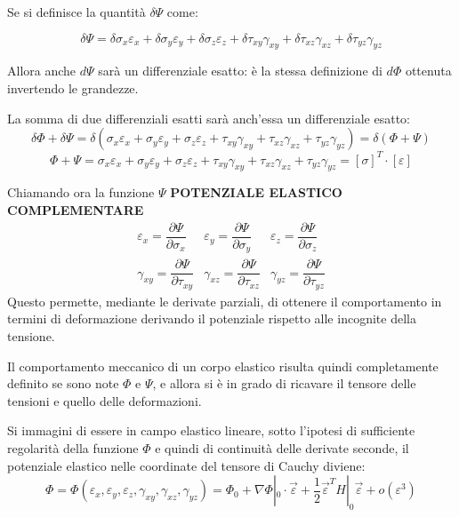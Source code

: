 \documentclass{article}
\begin{document}
\begin{adjustwidth}{2in}{}
	Se si definisce la quantità $\delta\Psi$ come: 
	
	\[
	\delta\Psi = \delta\sigma_x \varepsilon_x + \delta\sigma_y \varepsilon_y + \delta\sigma_z \varepsilon_z 
	+\delta\tau_{xy} \gamma_{xy} + \delta\tau_{xz} \gamma_{xz} + \delta\tau_{yz} \gamma_{yz}
	\]
	
	Allora anche  $d\Psi$ sarà un differenziale esatto: è la stessa definizione di $d\Phi$ ottenuta invertendo le grandezze. \newline
	
	La somma di due differenziali esatti sarà anch'essa un differenziale esatto: 
	\[
	\delta\Phi + \delta\Psi = \delta(\sigma_x \varepsilon_x + \sigma_y \varepsilon_y + \sigma_z \varepsilon_z 
	+\tau_{xy} \gamma_{xy} + \tau_{xz} \gamma_{xz} + \tau_{yz} \gamma_{yz}) = \delta(\Phi + \Psi)
	\]
	\[
	\Phi + \Psi = \sigma_x \varepsilon_x + \sigma_y \varepsilon_y + \sigma_z \varepsilon_z 
	+\tau_{xy} \gamma_{xy} + \tau_{xz} \gamma_{xz} + \tau_{yz} \gamma_{yz} = [\sigma]^T \cdot [\varepsilon]
	\]
	
	Chiamando ora la funzione $\Psi$ \textbf{POTENZIALE ELASTICO COMPLEMENTARE} 	
	\[
	\begin{array}{ccc}
		
		\varepsilon_x = \dfrac{\partial \Psi}{\partial \sigma_x} 	& \varepsilon_y = \dfrac{\partial \Psi}{\partial \sigma_y} & \varepsilon_z = \dfrac{\partial \Psi}{\partial \sigma_z} \\ 
		
		\gamma_{xy} = \dfrac{\partial \Psi}{\partial \tau_{xy}}	& \gamma_{xz} = \dfrac{\partial \Psi}{\partial \tau_{xz}}  & \gamma_{yz} = \dfrac{\partial \Psi}{\partial \tau_{yz}} 
		
	\end{array}
	\]
	Questo permette, mediante le derivate parziali, di ottenere il comportamento in termini di deformazione derivando il potenziale rispetto alle incognite della tensione. \newline 
	
	Il comportamento meccanico di un corpo elastico risulta quindi completamente definito se sono
	note $ \Phi $ e $ \Psi $, e allora si è in grado di ricavare il tensore delle tensioni e quello delle deformazioni. \newline
	
	Si immagini di essere in campo elastico lineare, sotto l’ipotesi di sufficiente regolarità della funzione $ \Phi $
	e quindi di continuità delle derivate seconde, il potenziale elastico nelle coordinate del tensore di Cauchy diviene:
	\[ \Phi = \Phi(\varepsilon_x, \varepsilon_y, \varepsilon_z, \gamma_{xy}, \gamma_{xz}, \gamma_{yz}) = \Phi_0 + \nabla\Phi|_0 \cdot \vec{\varepsilon} + \frac{1}{2} \vec{\varepsilon}^T H|_0 \vec{\varepsilon} + o(\varepsilon^3) \]
	

\end{adjustwidth}
\end{document}
